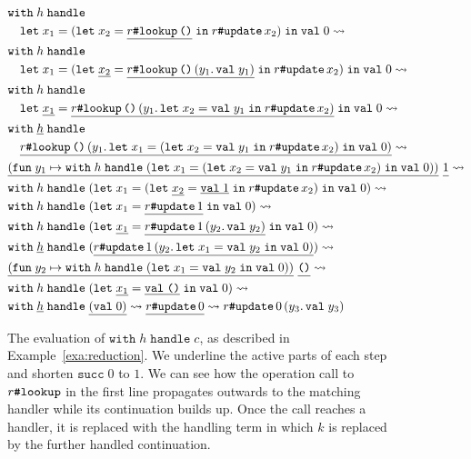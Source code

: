 \documentclass{LMCS}
\newcommand{\step}{\leadsto}
\newcommand{\kord}[1]{\mathtt{#1}}
\newcommand{\kop}[1]{\;\mathtt{#1}\;}
\newcommand{\kpre}[1]{\mathtt{#1}\;}
\newcommand{\cont}[2]{(#1.\,#2)}
\newcommand{\fun}[1]{\kpre{fun} #1 \mapsto}
\newcommand{\hash}[2]{#1\text{\texttt{\char35}}#2}
\newcommand{\letin}[1]{\kpre{let} #1 \kop{in}}
\newcommand{\call}[4]{{\hash{#1}{#2}\,{#3}\, #4}}
\newcommand{\unt}{\kord{\text{\texttt{()}}}}
\newcommand{\val}{\kpre{val}}
\newcommand{\withhandle}[2]{\kpre{with} #1 \kop{handle} #2}
\renewcommand{\succ}{\kpre{succ}}
\begin{document}
\begin{figure}[h]
\hrulefill
  \small
\newcommand{\hilite}{\underline}
\begin{align*}
  &\withhandle{h}{\\
  &\quad \letin{x_1 = (\letin{x_2 = \hilite{\hash{r}{\kord{lookup}} \, \unt}} \hash{r}{\kord{update}} \, x_2)} \val 0} \step \\
  &\withhandle{h}{\\
  &\quad \letin{x_1 = (\letin{\hilite{x_2} = \hilite{\call{r}{\kord{lookup}}{\unt}{\cont{y_1}{\val y_1}}}} \hash{r}{\kord{update}} \, x_2)} \val 0} \step \\
  &\withhandle{h}{\\
  &\quad \letin{\hilite{x_1} = \hilite{\call{r}{\kord{lookup}}{\unt}{\cont{y_1}{\letin{x_2 = \val y_1} \hash{r}{\kord{update}} \, x_2}}}} \val 0} \step \\
  &\withhandle{\hilite{h}}{\\
  &\quad \hilite{\call{r}{\kord{lookup}}{\unt}{\cont{y_1}{\letin{x_1 = (\letin{x_2 = \val y_1} \hash{r}{\kord{update}} \, x_2)} \val 0}}}} \step \\
  &\hilite{(\fun{y_1} \withhandle{h}{(\letin{x_1 = (\letin{x_2 = \val y_1} \hash{r}{\kord{update}} \, x_2)} \val 0)})} \,\, \hilite{1\vphantom{()}} \step \\
  &\withhandle{h}{(\letin{x_1 = (\letin{\hilite{x_2} = \hilite{\val 1}} \hash{r}{\kord{update}} \, x_2)} \val 0)} \step \\
  &\withhandle{h}{(\letin{x_1 = \hilite{\hash{r}{\kord{update}} \, 1}} \val 0)} \step \\
  &\withhandle{h}{(\letin{\hilite{x_1} = \hilite{\call{r}{\kord{update}}{1}{\cont{y_2}{\val y_2}}}} \val 0)} \step \\
  &\withhandle{\hilite{h}}{(\hilite{\call{r}{\kord{update}}{1}{\cont{y_2}{\letin{x_1 = \val y_2} \val 0}}})} \step \\
  &\hilite{(\fun{y_2} \withhandle{h}{(\letin{x_1 = \val y_2} \val 0)})} \,\, \hilite{\unt\vphantom{()}} \step \\
  &\withhandle{h}{(\letin{\hilite{x_1} = \hilite{\val \unt}} \val 0)} \step \\
  &\withhandle{\hilite{h}}{\hilite{(\val 0)}} \step
  \hilite{\hash{r}{\kord{update}} \, 0} \step \call{r}{\kord{update}}{0}{\cont{y_3}{\val y_3}}
\end{align*}
\caption{
  The evaluation of $\withhandle{h}{c}$, as described in Example~\ref{exa:reduction}.
  We underline the active parts of each step and shorten $\succ 0$ to $1$.
  We can see how the operation call to $\hash{r}{\kord{lookup}}$ in the first line propagates
  outwards to the matching handler while its continuation builds up.
  Once the call reaches a handler, it is replaced with the handling term
  in which $k$ is replaced by the further handled continuation.}
\label{fig:reduction}
\hrulefill
\end{figure}
\end{document}
